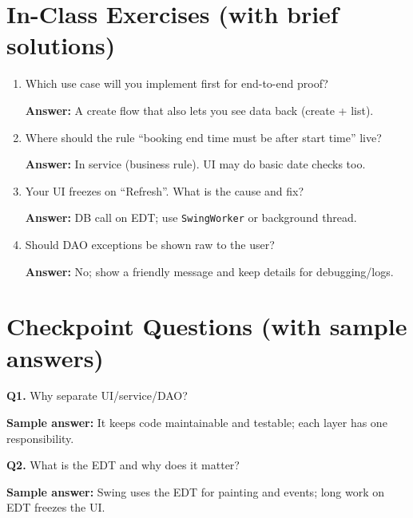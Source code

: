 \documentclass[11pt]{article}
\begin{document}
\section{In-Class Exercises (with brief solutions)}
\begin{enumerate}
  \item Which use case will you implement first for end-to-end proof?\par
  \textbf{Answer:} A create flow that also lets you see data back (create + list).

  \item Where should the rule ``booking end time must be after start time'' live?\par
  \textbf{Answer:} In service (business rule). UI may do basic date checks too.

  \item Your UI freezes on ``Refresh''. What is the cause and fix?\par
  \textbf{Answer:} DB call on EDT; use \texttt{SwingWorker} or background thread.

  \item Should DAO exceptions be shown raw to the user?\par
  \textbf{Answer:} No; show a friendly message and keep details for debugging/logs.
\end{enumerate}

\section{Checkpoint Questions (with sample answers)}
\textbf{Q1.} Why separate UI/service/DAO?\par
\textbf{Sample answer:} It keeps code maintainable and testable; each layer has one responsibility.

\vspace{0.6em}
\textbf{Q2.} What is the EDT and why does it matter?\par
\textbf{Sample answer:} Swing uses the EDT for painting and events; long work on EDT freezes the UI.
\end{document}
